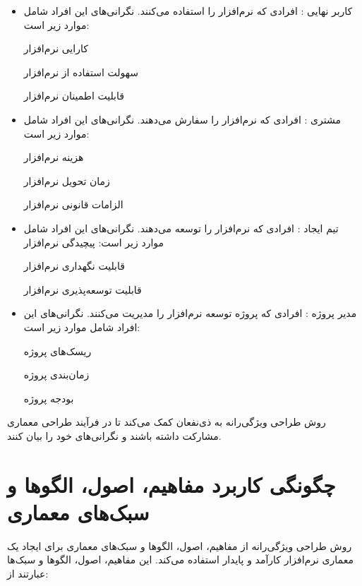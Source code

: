 \begin{itemize}
	\item کاربر نهایی  :
	افرادی که نرم‌افزار را استفاده می‌کنند. نگرانی‌های این افراد شامل موارد زیر است:
	
	کارایی نرم‌افزار
	
	سهولت استفاده از نرم‌افزار
	
	قابلیت اطمینان نرم‌افزار
	
	\item مشتری  :
	افرادی که نرم‌افزار را سفارش می‌دهند. نگرانی‌های این افراد شامل موارد زیر است:
	
	هزینه نرم‌افزار
	
	زمان تحویل نرم‌افزار
	
	الزامات قانونی نرم‌افزار
	
	\item تیم ایجاد  :
	افرادی که نرم‌افزار را توسعه می‌دهند. نگرانی‌های این افراد شامل موارد زیر است:
	پیچیدگی نرم‌افزار
	
	قابلیت نگهداری نرم‌افزار
	
	قابلیت توسعه‌پذیری نرم‌افزار
	
	\item مدیر پروژه  :
	افرادی که پروژه توسعه نرم‌افزار را مدیریت می‌کنند. نگرانی‌های این افراد شامل موارد زیر است:
	
	ریسک‌های پروژه
	
	زمان‌بندی پروژه
	
	بودجه پروژه
\end{itemize}

روش طراحی ویژگی‌رانه به ذی‌نفعان کمک می‌کند تا در فرآیند طراحی معماری مشارکت داشته باشند و نگرانی‌های خود را بیان کنند.

\section{چگونگی کاربرد مفاهیم، اصول، الگوها و سبک‌های معماری}

روش طراحی ویژگی‌رانه از مفاهیم، اصول، الگوها و سبک‌های معماری برای ایجاد یک معماری نرم‌افزار کارآمد و پایدار استفاده می‌کند. این مفاهیم، اصول، الگوها و سبک‌ها عبارتند از:

